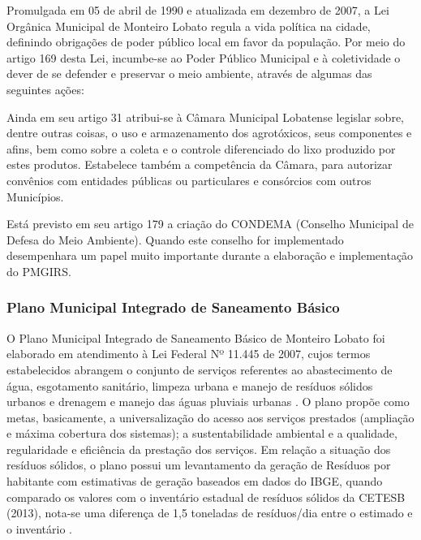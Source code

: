 	Promulgada em 05 de abril de 1990 e atualizada em dezembro de 2007, a Lei Orgânica Municipal de Monteiro Lobato regula a vida política na cidade, definindo obrigações de poder público local em favor da população. Por meio do artigo 169 desta Lei, incumbe-se ao Poder Público Municipal e à coletividade o dever de se defender e preservar o meio ambiente, através de algumas das seguintes ações:
	
	
	Ainda em seu artigo 31 atribui-se à Câmara Municipal Lobatense legislar sobre, dentre outras coisas, o uso e armazenamento dos agrotóxicos, seus componentes e afins, bem como sobre a coleta e o controle diferenciado do lixo produzido por estes produtos. Estabelece também a competência da Câmara, para autorizar convênios com entidades públicas ou particulares e consórcios com outros Municípios.
	
	Está previsto em seu artigo 179 a criação do CONDEMA (Conselho Municipal de Defesa do Meio Ambiente). Quando este conselho for implementado desempenhara um papel muito importante durante a elaboração e implementação do PMGIRS.
	
	\subsubsection{Plano Municipal Integrado de Saneamento Básico}
	
	O Plano Municipal Integrado de Saneamento Básico de Monteiro Lobato foi elaborado em atendimento à Lei Federal Nº 11.445 de 2007, cujos termos estabelecidos abrangem o conjunto de serviços referentes ao abastecimento de água, esgotamento sanitário, limpeza urbana e manejo de resíduos sólidos urbanos e drenagem e manejo das águas pluviais urbanas \cite{ml_pmisb_2007}. O plano propõe como metas, basicamente, a universalização do acesso aos serviços prestados (ampliação e máxima cobertura dos sistemas); a sustentabilidade ambiental e a qualidade, regularidade e eficiência da prestação dos serviços. Em relação a situação dos resíduos sólidos, o plano possui um levantamento da geração de Resíduos por habitante com estimativas de geração baseados em dados do IBGE, quando comparado os valores com o inventário estadual de resíduos sólidos da CETESB (2013), nota-se uma diferença de 1,5 toneladas de resíduos/dia entre o estimado e o inventário \cite{cetesb_inventario_2013}.
	
